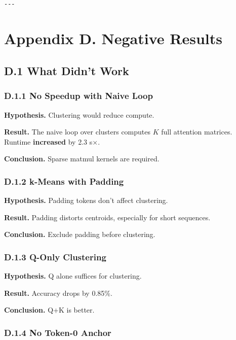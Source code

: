 \begin{lstlisting}

---
\end{lstlisting}


\section{Appendix D. Negative Results}

\subsection{D.1 What Didn't Work}

\subsubsection{D.1.1 No Speedup with Naive Loop}

\textbf{Hypothesis.} Clustering would reduce compute.

\textbf{Result.} The naive loop over clusters computes $K$ full attention 
matrices. Runtime \textbf{increased} by 2.3 s$\times$.

\textbf{Conclusion.} Sparse matmul kernels are required.

\subsubsection{D.1.2 k-Means with Padding}

\textbf{Hypothesis.} Padding tokens don't affect clustering.

\textbf{Result.} Padding distorts centroids, especially for short sequences.

\textbf{Conclusion.} Exclude padding before clustering.

\subsubsection{D.1.3 Q-Only Clustering}

\textbf{Hypothesis.} Q alone suffices for clustering.

\textbf{Result.} Accuracy drops by 0.85\%.

\textbf{Conclusion.} Q+K is better.

\subsubsection{D.1.4 No Token-0 Anchor}

